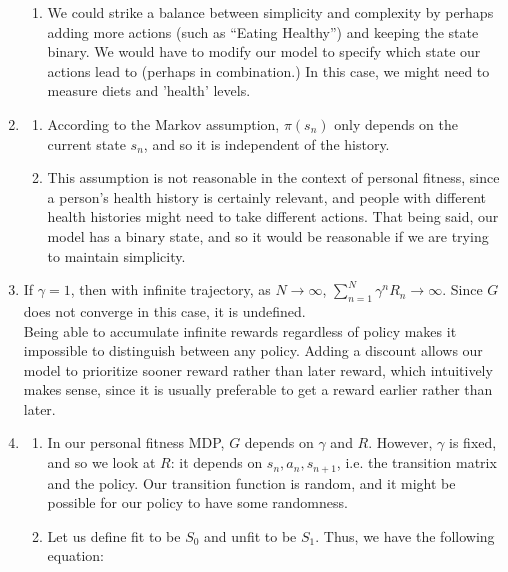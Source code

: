 \documentclass[submit]{harvardml}
\begin{document}
\begin{enumerate}
\begin{enumerate}
    \item 
    We could strike a balance between simplicity and complexity by perhaps adding more actions (such as ``Eating Healthy'') and keeping the state binary. We would have to modify our model to specify which state our actions lead to (perhaps in combination.) In this case, we might need to measure diets and 'health' levels.
    \end{enumerate}

\item 
\begin{enumerate}
    \item According to the Markov assumption, $\pi(s_n)$ only depends on the current state $s_n$, and so it is independent of the history.

    \item This assumption is not reasonable in the context of personal fitness, since a person's health history is certainly relevant, and people with different health histories might need to take different actions. That being said, our model has a binary state, and so it would be reasonable if we are trying to maintain simplicity.
\end{enumerate}

\item 
If $\gamma = 1$, then with infinite trajectory, as $N \rightarrow \infty$, $\sum^N_{n=1}\gamma^n R_n \rightarrow \infty$. Since $G$ does not converge in this case, it is undefined.\\
Being able to accumulate infinite rewards regardless of policy makes it impossible to distinguish between any policy. Adding a discount allows our model to prioritize sooner reward rather than later reward, which intuitively makes sense, since it is usually preferable to get a reward earlier rather than later.

\item 
\begin{enumerate}
    \item In our personal fitness MDP, $G$ depends on $\gamma$ and $R$. However, $\gamma$ is fixed, and so we look at $R$: it depends on $s_n, a_n, s_{n+1}$, i.e. the transition matrix and the policy. Our transition function is random, and it might be possible for our policy to have some randomness.

    \item Let us define fit to be $S_0$ and unfit to be $S_1$. Thus, we have the following equation:
    \begin{equation*}
        
    \end{equation*}
\end{enumerate}


\end{enumerate}
\end{document}

